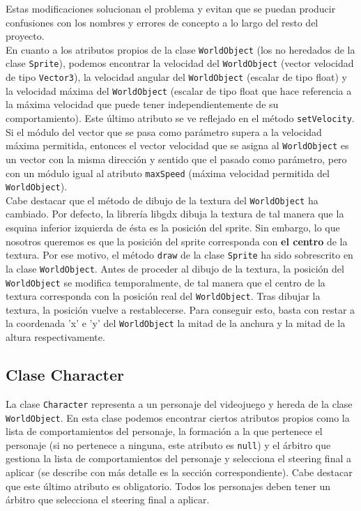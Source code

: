 Estas modificaciones solucionan el problema y evitan que se puedan producir confusiones con los nombres y errores de concepto a lo largo del resto del proyecto. \\

En cuanto a los atributos propios de la clase \texttt{WorldObject} (los no heredados de la clase \texttt{Sprite}), podemos encontrar la velocidad del \texttt{WorldObject} (vector velocidad de tipo \texttt{Vector3}), la velocidad angular del \texttt{WorldObject} (escalar de tipo float) y la velocidad máxima del \texttt{WorldObject} (escalar de tipo float que hace referencia a la máxima velocidad que puede tener independientemente de su comportamiento). Este último atributo se ve reflejado en el método \texttt{setVelocity}. Si el módulo del vector que se pasa como parámetro supera a la velocidad máxima permitida, entonces el vector velocidad que se asigna al \texttt{WorldObject} es un vector con la misma dirección y sentido que el pasado como parámetro, pero con un módulo igual al atributo \texttt{maxSpeed} (máxima velocidad permitida del \texttt{WorldObject}). \\

Cabe destacar que el método de dibujo de la textura del \texttt{WorldObject} ha cambiado. Por defecto, la librería libgdx dibuja la textura de tal manera que la esquina inferior izquierda de ésta es la posición del sprite. Sin embargo, lo que nosotros queremos es que la posición del sprite corresponda con \textbf{el centro} de la textura. Por ese motivo, el método \texttt{draw} de la clase \texttt{Sprite} ha sido sobrescrito en la clase \texttt{WorldObject}. Antes de proceder al dibujo de la textura, la posición del \texttt{WorldObject} se modifica temporalmente, de tal manera que el centro de la textura corresponda con la posición real del \texttt{WorldObject}. Tras dibujar la textura, la posición vuelve a restablecerse. Para conseguir esto, basta con restar a la coordenada 'x' e 'y' del \texttt{WorldObject} la mitad de la anchura y la mitad de la altura respectivamente.


\subsection{Clase Character}
\label{clase-personaje}

La clase \texttt{Character} representa a un personaje del videojuego y hereda de la clase \texttt{WorldObject}. En esta clase podemos encontrar ciertos atributos propios como la lista de comportamientos del personaje, la formación a la que pertenece el personaje (si no pertenece a ninguna, este atributo es \texttt{null}) y el árbitro que gestiona la lista de comportamientos del personaje y selecciona el steering final a aplicar (se describe con más detalle es la sección correspondiente). Cabe destacar que este último atributo es obligatorio. Todos los personajes deben tener un árbitro que selecciona el steering final a aplicar. \\

